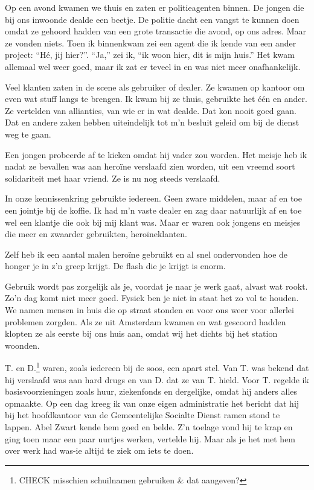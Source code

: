 \documentclass[10pt,twoside,openright]{memoir}
\begin{document}
Op een avond kwamen we thuis en zaten er politieagenten binnen. De jongen die bij ons inwoonde dealde een beetje. De politie dacht een vangst te kunnen doen omdat ze gehoord hadden van een grote transactie die avond, op ons adres. Maar ze vonden niets. Toen ik binnenkwam zei een agent die ik kende van een ander project: ``Hé, jij hier?''. ``Ja,'' zei ik, ``ik woon hier, dit is mijn huis.'' Het kwam allemaal wel weer goed, maar ik zat er teveel in en was niet meer onafhankelijk. 

Veel klanten zaten in de scene als gebruiker of dealer. Ze kwamen op kantoor om even wat stuff langs te brengen. Ik kwam bij ze thuis, gebruikte het één en ander. Ze vertelden van allianties, van wie er in wat dealde. Dat kon nooit goed gaan. Dat en andere zaken hebben uiteindelijk tot m’n besluit geleid om bij de dienst weg te gaan. 

Een jongen probeerde af te kicken omdat hij vader zou worden. Het meisje heb ik nadat ze bevallen was aan heroïne verslaafd zien worden, uit een vreemd soort solidariteit met haar vriend. Ze is nu nog steeds verslaafd. 

In onze kennissenkring gebruikte iedereen. Geen zware middelen, maar af en toe een jointje bij de koffie. Ik had m’n vaste dealer en zag daar natuurlijk af en toe wel een klantje die ook bij mij klant was. Maar er waren ook jongens en meisjes die meer en zwaarder gebruikten, heroïneklanten. 

Zelf heb ik een aantal malen heroïne gebruikt en al snel ondervonden hoe de honger je in z’n greep krijgt. De flash die je krijgt is enorm.

Gebruik wordt pas zorgelijk als je, voordat je naar je werk gaat, alvast wat rookt. Zo’n dag komt niet meer goed. Fysiek ben je niet in staat het zo vol te houden. We namen mensen in huis die op straat stonden en voor ons weer voor allerlei problemen zorgden. Als ze uit Amsterdam kwamen en wat gescoord hadden klopten ze als eerste bij ons huis aan, omdat wij het dichts bij het station woonden. 

T. en D.\footnote{CHECK misschien schuilnamen gebruiken \& dat aangeven?} waren, zoals iedereen bij de soos, een apart stel. Van T. was bekend dat hij verslaafd was aan hard drugs en van D. dat ze van T. hield. Voor T. regelde ik basisvoorzieningen zoals huur, ziekenfonds en dergelijke, omdat hij anders alles opmaakte. Op een dag kreeg ik van onze eigen administratie het bericht dat hij bij het hoofdkantoor van de Gemeentelijke Socialte Dienst ramen stond te lappen. Abel Zwart kende hem goed en belde. Z’n toelage vond hij te krap en ging toen maar een paar uurtjes werken, vertelde hij. Maar als je het met hem over werk had was-ie altijd te ziek om iets te doen. 
\end{document}
